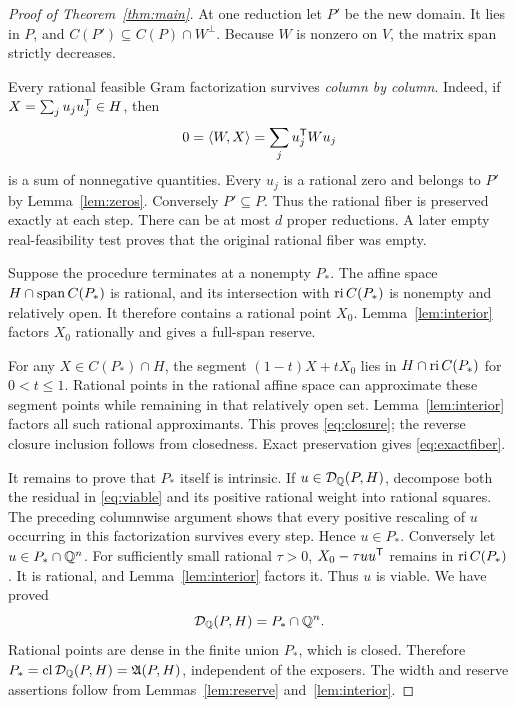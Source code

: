 \begin{proof}[Proof of Theorem~\ref{thm:main}]
At one reduction let $P'$ be the new domain. It lies in $P$, and $C(P')\subseteq C(P)\cap W^\perp$. Because $W$ is nonzero on $V$, the matrix span strictly decreases.

Every rational feasible Gram factorization survives \emph{column by column}. Indeed, if $X=\sum_j u_ju_j^{\mathsf T}\in H$, then
\[
 0=\langle W,X\rangle=\sum_j u_j^{\mathsf T} Wu_j
\]
is a sum of nonnegative quantities. Every $u_j$ is a rational zero and belongs to $P'$ by Lemma~\ref{lem:zeros}. Conversely $P'\subseteq P$. Thus the rational fiber is preserved exactly at each step. There can be at most $d$ proper reductions. A later empty real-feasibility test proves that the original rational fiber was empty.

Suppose the procedure terminates at a nonempty $P_*$. The affine space $H\cap\operatorname{span} C(P_*)$ is rational, and its intersection with $\operatorname{ri} C(P_*)$ is nonempty and relatively open. It therefore contains a rational point $X_0$. Lemma~\ref{lem:interior} factors $X_0$ rationally and gives a full-span reserve.

For any $X\in C(P_*)\cap H$, the segment $(1-t)X+tX_0$ lies in $H\cap\operatorname{ri} C(P_*)$ for $0<t\le1$. Rational points in the rational affine space can approximate these segment points while remaining in that relatively open set. Lemma~\ref{lem:interior} factors all such rational approximants. This proves \eqref{eq:closure}; the reverse closure inclusion follows from closedness. Exact preservation gives \eqref{eq:exactfiber}.

It remains to prove that $P_*$ itself is intrinsic. If $u\in\mathcal D_{\mathbb Q}(P,H)$, decompose both the residual in \eqref{eq:viable} and its positive rational weight into rational squares. The preceding columnwise argument shows that every positive rescaling of $u$ occurring in this factorization survives every step. Hence $u\in P_*$. Conversely let $u\in P_*\cap\mathbb Q^n$. For sufficiently small rational $\tau>0$, $X_0-\tau uu^{\mathsf T}$ remains in $\operatorname{ri} C(P_*)$. It is rational, and Lemma~\ref{lem:interior} factors it. Thus $u$ is viable. We have proved
\[
 \mathcal D_{\mathbb Q}(P,H)=P_*\cap\mathbb Q^n.
\]
Rational points are dense in the finite union $P_*$, which is closed. Therefore $P_*=\operatorname{cl}\mathcal D_{\mathbb Q}(P,H)=\mathfrak A(P,H)$, independent of the exposers. The width and reserve assertions follow from Lemmas~\ref{lem:reserve} and~\ref{lem:interior}.
\end{proof}

